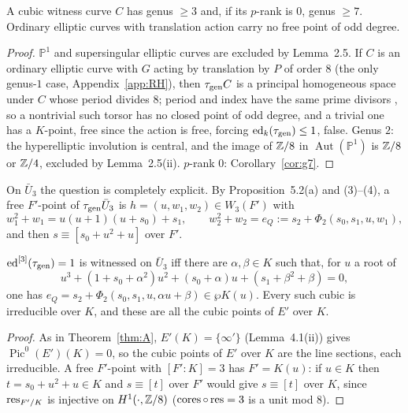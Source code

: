 \begin{proposition}\label{prop:cubiccurves}
A cubic witness curve $C$ has genus $\ge3$ and, if its $p$-rank is $0$, genus $\ge7$.
Ordinary elliptic curves with translation action carry no free point of odd degree.
\end{proposition}

\begin{proof}
$\mathbb P^1$ and supersingular elliptic curves are excluded by Lemma~2.5. If $C$ is an
ordinary elliptic curve with $G$ acting by translation by $P$ of order $8$ (the only
genus-$1$ case, Appendix~\ref{app:RH}), then $\tau_{\mathrm{gen}} C$ is a principal homogeneous
space under $C$ whose period divides $8$; period and index have the same prime divisors
\cite{LT}, so a nontrivial such torsor has no closed point of odd degree, and a trivial
one has a $K$-point, free since the action is free, forcing $\operatorname{ed}_k(\tau_{\mathrm{gen}})\le1$,
false. Genus $2$: the hyperelliptic involution is central, and the image of $\mathbb Z/8$ in
$\operatorname{Aut}(\mathbb P^1)$ is $\mathbb Z/8$ or $\mathbb Z/4$, excluded by Lemma~2.5(ii).
$p$-rank $0$: Corollary~\ref{cor:g7}.
\end{proof}

On $\bar U_3$ the question is completely explicit. By Proposition~5.2(a) and (3)--(4), a
free $F'$-point of $\tau_{\mathrm{gen}}\bar U_3$ is $h=(u,w_1,w_2)\in W_3(F')$ with
\begin{equation}\label{eq:U3eq}
w_1^2+w_1=u(u+1)(u+s_0)+s_1,\qquad w_2^2+w_2=e_Q:=s_2+\Phi_2(s_0,s_1,u,w_1),
\end{equation}
and then $s\equiv[s_0+u^2+u]$ over $F'$.

\begin{proposition}[reformulation]\label{prop:C}
$\operatorname{ed}^{[3]}(\tau_{\mathrm{gen}})=1$ is witnessed on $\bar U_3$ iff there are $\alpha,\beta\in K$ such
that, for $u$ a root of
\[
u^3+(1+s_0+\alpha^2)u^2+(s_0+\alpha)u+(s_1+\beta^2+\beta)=0,
\]
one has $e_Q=s_2+\Phi_2(s_0,s_1,u,\alpha u+\beta)\in\wp K(u)$. Every such cubic is
irreducible over $K$, and these are all the cubic points of $E'$ over $K$.
\end{proposition}

\begin{proof}
As in Theorem~\ref{thm:A}, $E'(K)=\{\infty'\}$ (Lemma~4.1(ii)) gives
$\operatorname{Pic}^0(E')(K)=0$, so the cubic points of $E'$ over $K$ are the line
sections, each irreducible. A free $F'$-point with $[F':K]=3$ has $F'=K(u)$: if $u\in K$
then $t=s_0+u^2+u\in K$ and $s\equiv[t]$ over $F'$ would give $s\equiv[t]$ over $K$,
since $\operatorname{res}_{F'/K}$ is injective on $H^1(\cdot,\mathbb Z/8)$ ($\operatorname{cores}\circ\operatorname{res}=3$ is a unit
mod $8$).
\end{proof}

